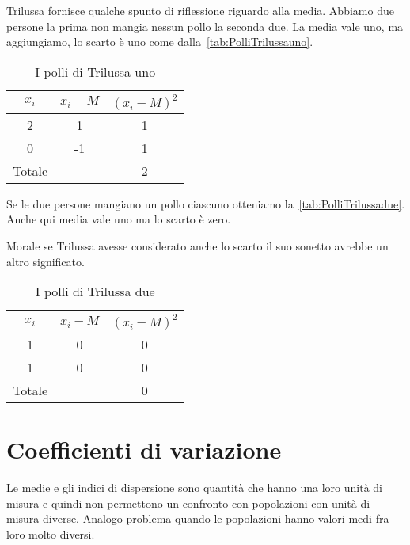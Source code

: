 Trilussa fornisce qualche spunto di riflessione riguardo alla media. Abbiamo due persone la prima non mangia nessun pollo la seconda due. La media vale uno, ma aggiungiamo, lo scarto è uno come dalla~\vref{tab:PolliTrilussauno}.\par
\begin{table}
	\centering
	\begin{tabular}{S[table-format=1.0]S[table-format=2.0]S[table-format=1.2] }
		\toprule
		{$x_i$}	  & {$x_i-M$} & {$(x_i-M )^2$}  \\
			 & 1  & 1   \\ 
		0	 & -1 & 1   \\ 
		\midrule 
		{Totale}& & 2    \\
		\bottomrule 
	\end{tabular} 
	\caption{I polli di Trilussa uno}
	\label{tab:PolliTrilussauno}
\end{table}
Se le due persone mangiano un pollo ciascuno otteniamo la~\vref{tab:PolliTrilussadue}. Anche qui media vale uno ma lo scarto è zero.\par  Morale se Trilussa avesse considerato anche lo scarto il suo sonetto avrebbe un altro significato.
\begin{table}
	\centering
	\begin{tabular}{S[table-format=1.0]S[table-format=2.0]S[table-format=1.2] }
		\toprule
		{$x_i$}	  & {$x_i-M$} & {$(x_i-M )^2$}  \\
			 & 0  & 0   \\ 
		1	 & 0 & 0   \\ 
		\midrule 
		{Totale}& & 0    \\
		\bottomrule 
	\end{tabular} 
	\caption{I polli di Trilussa due}
	\label{tab:PolliTrilussadue}
\end{table}
\section{Coefficienti di variazione}
Le medie e gli indici di dispersione sono quantità che hanno una loro unità di misura e quindi non permettono un confronto con popolazioni con unità di misura diverse. Analogo problema quando le popolazioni hanno valori medi fra loro molto diversi. 
